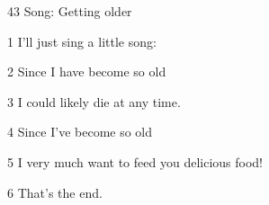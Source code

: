
43 Song: Getting older

1 I'll just sing a little song:

2 Since I have become so old

3 I could likely die at any time.

4 Since I've become so old

5 I very much want to feed you delicious food!

6 That's the end.


